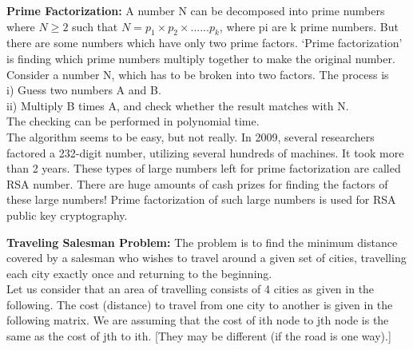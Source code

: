 \documentclass[11pt]{article}
\begin{document}
\vspace*{0.3cm}
\hspace*{0.1cm} \textbf{Prime Factorization:} A number N can be decomposed into prime numbers where
$N \geq 2$ such that $N = p _{1} \times p _{2} \times . . . . . . p _{k}$, where pi are k prime numbers. But there are
some numbers which have only two prime factors. ‘Prime factorization’ is finding which prime numbers
multiply together to make the original number.\\
\hspace*{0.5cm} Consider a number N, which has to be broken into two factors. The process is\\

\vspace*{0.2cm}
\hspace*{0.5cm} i) Guess two numbers A and B.\\
\hspace*{0.5cm} ii) Multiply B times A, and check whether the result matches with N.\\

\vspace*{0.2cm}
The checking can be performed in polynomial time.\\
\hspace*{0.5cm} The algorithm seems to be easy, but not really. In 2009, several researchers factored a 232-digit number,
utilizing several hundreds of machines. It took more than 2 years. These types of large numbers left
for prime factorization are called RSA number.
There are huge amounts of cash prizes for finding the
factors of these large numbers! Prime factorization of such large numbers is used for RSA public key
cryptography.\\

\vspace*{0.3cm}

\hspace*{0.1cm} \textbf{Traveling Salesman Problem:} The problem is to find the minimum distance covered
by a salesman who wishes to travel around a given set of cities, travelling each
city exactly once and returning to the beginning.\\
\hspace*{0.5cm}  Let us consider that an area of travelling consists of 4 cities as given in the following. The cost (distance)
to travel from one city to another is given in the following matrix. We are assuming that the cost of
ith node to jth node is the same as the cost of jth to ith. [They may be different (if the road is one way).]
\end{document}
